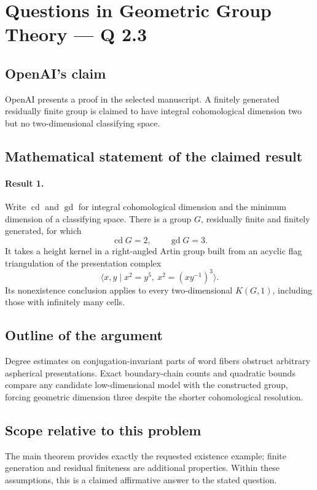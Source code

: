 \documentclass[11pt]{article}
\begin{document}
\section*{Questions in Geometric Group Theory — Q 2.3}

\subsection{OpenAI's claim}
OpenAI presents a proof in the selected manuscript. A finitely generated residually finite group is claimed to have integral cohomological dimension two but no two-dimensional classifying space.

\subsection{Mathematical statement of the claimed result}
\paragraph{Result 1.} Write \(\operatorname{cd}\) and \(\operatorname{gd}\) for integral cohomological dimension and the minimum dimension of a classifying space. There is a group \(G\), residually finite and finitely generated, for which
\[
 \operatorname{cd}G=2,\qquad\operatorname{gd}G=3.
\]
It takes a height kernel in a right-angled Artin group built from an acyclic flag triangulation of the presentation complex
\[
 \langle x,y\mid x^2=y^5,\ x^2=(xy^{-1})^3\rangle.
\]
Its nonexistence conclusion applies to every two-dimensional \(K(G,1)\), including those with infinitely many cells.

\subsection{Outline of the argument}
Degree estimates on conjugation-invariant parts of word fibers obstruct arbitrary aspherical presentations. Exact boundary-chain counts and quadratic bounds compare any candidate low-dimensional model with the constructed group, forcing geometric dimension three despite the shorter cohomological resolution.

\subsection{Scope relative to this problem}
The main theorem provides exactly the requested existence example; finite generation and residual finiteness are additional properties. Within these assumptions, this is a claimed affirmative answer to the stated question.
\end{document}
